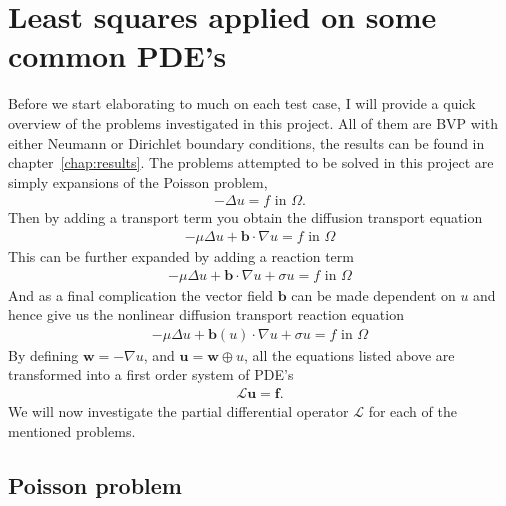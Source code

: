 \section{Least squares applied on some common PDE's}
Before we start elaborating to much on each test case, I will provide a quick overview of the problems investigated in this project. All of them are BVP with either Neumann or Dirichlet boundary conditions, the results can be found in chapter~\ref{chap:results}. The problems attempted to be solved in this project are simply expansions of the Poisson problem,  
%
\begin{align}
	-\Delta u = f \text{  in  } \Omega.
	\label{eq:PossionImplementation}
\end{align}
%
Then by adding a transport term you obtain the diffusion transport equation
%
\begin{align}
	-\mu \Delta u + \mathbf{b} \cdot \nabla u = f \text{ in } \Omega
	\label{eq:DiffTransImplementation}
\end{align}
%
This can be further expanded by adding a reaction term
%
\begin{align}
	-\mu \Delta u + \mathbf{b} \cdot \nabla u +\sigma u = f \text{ in } \Omega
	\label{eq:ReactionImplementation}
\end{align}
%
And as a final complication the vector field $\mathbf{b}$ can be made dependent on $u$ and hence give us the nonlinear diffusion transport reaction equation
%
\begin{align}
	-\mu \Delta u + \mathbf{b}(u) \cdot \nabla u +\sigma u = f \text{ in } \Omega
	\label{eq:ReactionImplementation}
\end{align}
%
By defining $\mathbf{w}=-\nabla u$, and $ \mathbf{u} = \mathbf{w} \oplus u $, all the equations listed above are transformed into a first order system of PDE's 
%
\begin{align}
	\mathcal{L}\mathbf{u} = \mathbf{f}.
	\label{eq:genFirstOrderFormulation}
\end{align}
%
We will now investigate the partial differential operator $\mathcal{L}$ for each of the mentioned problems.
%

\subsection{Poisson problem}

